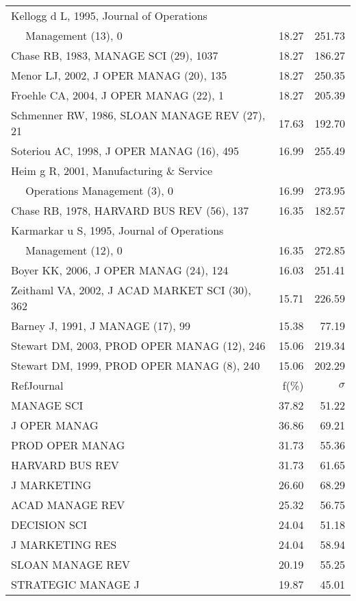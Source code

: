 \documentclass[a4paper,11pt]{report}
\begin{document}
\begin{landscape}
\begin{table}[!ht]
{\begin{tabular}{|l r r|}
Kellogg d L, 1995, Journal of Operations &  & \\
$\quad$ Management (13), 0 & 18.27 & 251.73\\
Chase RB, 1983, MANAGE SCI (29), 1037 & 18.27 & 186.27\\
Menor LJ, 2002, J OPER MANAG (20), 135 & 18.27 & 250.35\\
Froehle CA, 2004, J OPER MANAG (22), 1 & 18.27 & 205.39\\
Schmenner RW, 1986, SLOAN MANAGE REV (27), 21 & 17.63 & 192.70\\
Soteriou AC, 1998, J OPER MANAG (16), 495 & 16.99 & 255.49\\
Heim g R, 2001, Manufacturing \& Service &  & \\
$\quad$ Operations Management (3), 0 & 16.99 & 273.95\\
Chase RB, 1978, HARVARD BUS REV (56), 137 & 16.35 & 182.57\\
Karmarkar u S, 1995, Journal of Operations &  & \\
$\quad$ Management (12), 0 & 16.35 & 272.85\\
Boyer KK, 2006, J OPER MANAG (24), 124 & 16.03 & 251.41\\
Zeithaml VA, 2002, J ACAD MARKET SCI (30), 362 & 15.71 & 226.59\\
Barney J, 1991, J MANAGE (17), 99 & 15.38 & 77.19\\
Stewart DM, 2003, PROD OPER MANAG (12), 246 & 15.06 & 219.34\\
Stewart DM, 1999, PROD OPER MANAG (8), 240 & 15.06 & 202.29\\
\hline
\hline
RefJournal & f(\%) & $\sigma$\\
\hline
MANAGE SCI & 37.82 & 51.22\\
J OPER MANAG & 36.86 & 69.21\\
PROD OPER MANAG & 31.73 & 55.36\\
HARVARD BUS REV & 31.73 & 61.65\\
J MARKETING & 26.60 & 68.29\\
ACAD MANAGE REV & 25.32 & 56.75\\
DECISION SCI & 24.04 & 51.18\\
J MARKETING RES & 24.04 & 58.94\\
SLOAN MANAGE REV & 20.19 & 55.25\\
STRATEGIC MANAGE J & 19.87 & 45.01\\
\hline
\end{tabular}
}
\end{table}


\end{landscape}
\end{document}

